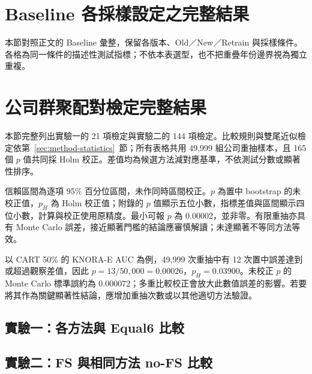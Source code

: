 \clearpage
\section{Baseline 各採樣設定之完整結果}\label{sec:results-baseline-full}

本節對照正文的 Baseline 彙整，保留各版本、Old／New／Retrain 與採樣條件。各格為同一條件的描述性測試指標；不依本表選型，也不把重疊年份邊界視為獨立重複。



\section{公司群聚配對檢定完整結果}\label{sec:stats-full}

本節完整列出實驗一的 21 項檢定與實驗二的 144 項檢定。比較規則與雙尾近似檢定依第~\ref{sec:method-statistics}~節；所有表格共用 49,999 組公司重抽樣本，且 165 個 \(p\) 值共同採 Holm 校正。差值均為候選方法減對應基準，不依測試分數或顯著性排序。

信賴區間為逐項 95\% 百分位區間，未作同時區間校正。\(p\) 為置中 bootstrap 的未校正值，\(p_H\) 為 Holm 校正值；附錄的 \(p\) 值顯示五位小數，指標差值與區間顯示四位小數，計算與校正使用原精度。最小可報 \(p\) 為 0.00002，並非零。有限重抽亦具有 Monte Carlo 誤差，接近顯著門檻的結論應審慎解讀；未達顯著不等同方法等效。

以 CART 50\% 的 KNORA-E AUC 為例，49,999 次重抽中有 12 次置中誤差達到或超過觀察差值，因此 \(p=13/50{,}000=0.00026\)，\(p_H=0.03900\)。未校正 \(p\) 的 Monte Carlo 標準誤約為 0.000072；多重比較校正會放大此數值誤差的影響。若要將其作為關鍵顯著性結論，應增加重抽次數或以其他適切方法驗證。

\subsection*{實驗一：各方法與 Equal6 比較}


\subsection*{實驗二：FS 與相同方法 no-FS 比較}





